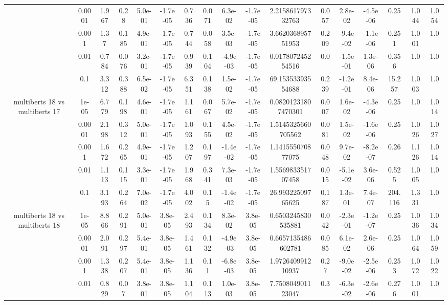 \begin{tabular}{|c|c|c|c|c|c|c|c|c|c|c|c|c|c|c|c|c|}
 & 0.0001 & 1.967 & 0.28 & 5.0e-01 & -1.7e-05 & 0.736 & 0.071 & 6.3e-02 & -1.7e-05 & 2.215861797332763 & 0.057 & 2.8e-02 & -4.5e-06 & 0.25 & 1.044 & 1.054 \\
 & 0.001 & 1.37 & 0.185 & 4.9e-01 & -1.7e-05 & 0.744 & 0.058 & 3.5e-03 & -1.7e-05 & 3.662036895751953 & 0.209 & -9.4e-02 & -1.1e-06 & 0.251 & 1.001 & 1.0 \\
 & 0.01 & 0.784 & 0.076 & 3.2e-01 & -1.7e-05 & 0.939 & 0.104 & -4.9e-03 & -1.7e-05 & 0.017807245254516 & 0.0 & -1.5e-01 & 1.3e-06 & 0.356 & 1.0 & 1.0 \\
 & 0.1 & 3.312 & 0.388 & 6.5e-02 & -1.7e-05 & 6.351 & 0.138 & 1.5e-02 & -1.7e-05 & 69.15353393554688 & 0.239 & -1.2e-01 & 8.4e-06 & 15.257 & 1.003 & 1.0 \\
\hline
\multirow{5}{*}{multiberts 18 vs multiberts 17} & 1e-05 & 6.779 & 0.198 & 4.6e-01 & -1.7e-05 & 1.161 & 0.067 & 5.7e-02 & -1.7e-05 & 0.08201231807470301 & 0.007 & 1.6e-02 & -4.3e-06 & 0.25 & 1.0 & 1.014 \\
 & 0.0001 & 2.198 & 0.312 & 5.0e-01 & -1.7e-05 & 1.093 & 0.155 & 4.5e-02 & -1.7e-05 & 1.5145325660705562 & 0.081 & 1.5e-02 & -1.6e-06 & 0.25 & 1.026 & 1.027 \\
 & 0.001 & 1.672 & 0.265 & 4.9e-01 & -1.7e-05 & 1.207 & 0.197 & -1.4e-02 & -1.7e-05 & 1.141555070877075 & 0.048 & 9.7e-02 & -8.2e-07 & 0.26 & 1.126 & 1.014 \\
 & 0.01 & 1.113 & 0.115 & 3.3e-01 & -1.7e-05 & 1.968 & 0.341 & 7.3e-03 & -1.7e-05 & 1.556983351707458 & 0.015 & -5.1e-02 & 3.6e-06 & 0.525 & 1.005 & 1.0 \\
 & 0.1 & 3.193 & 0.264 & 7.0e-02 & -1.7e-05 & 4.002 & 0.15 & -1.4e-02 & -1.7e-05 & 26.99322509765625 & 0.187 & 1.3e-01 & 7.4e-07 & 204.116 & 1.331 & 1.0 \\
\hline
\multirow{5}{*}{multiberts 18 vs multiberts 18} & 1e-05 & 8.866 & 0.291 & 5.0e-01 & 3.8e-05 & 2.493 & 0.134 & 8.3e-02 & 3.8e-05 & 0.6503245830535881 & 0.042 & -2.3e-01 & -1.2e-07 & 0.25 & 1.036 & 1.034 \\
 & 0.0001 & 2.091 & 0.297 & 5.4e-01 & 3.8e-05 & 1.461 & 0.132 & -4.9e-03 & 3.8e-05 & 0.6657135486602781 & 0.085 & 6.1e-02 & 2.6e-06 & 0.25 & 1.064 & 1.059 \\
 & 0.001 & 1.338 & 0.207 & 5.4e-01 & 3.8e-05 & 1.136 & 0.11 & -6.8e-03 & 3.8e-05 & 1.972640991210937 & 0.27 & -9.0e-02 & -2.5e-06 & 0.253 & 1.072 & 1.022 \\
 & 0.01 & 0.829 & 0.07 & 3.8e-01 & 3.8e-05 & 1.104 & 0.113 & 1.0e-03 & 3.8e-05 & 7.750804901123047 & 0.3 & -6.3e-02 & -2.6e-06 & 0.276 & 1.001 & 1.0 \\

\end{tabular}
